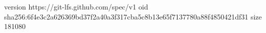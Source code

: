 version https://git-lfs.github.com/spec/v1
oid sha256:6f4e3c2a626369bd37f2a40a3f317cba5c8b13e65f7137780a88f4850421df31
size 181080
